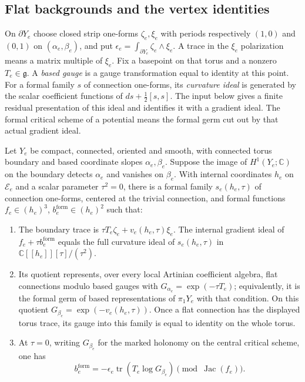 \subsection{Flat backgrounds and the vertex identities}

On $\partial Y_e$ choose closed strip one-forms $\zeta_e,\xi_e$ with
periods respectively $(1,0)$ and $(0,1)$ on
$(\alpha_e,\beta_e)$, and put
$\epsilon_e=\int_{\partial Y_e}\zeta_e\wedge\xi_e$.
A trace in the $\xi_e$ polarization means a matrix multiple of
$\xi_e$.  Fix a basepoint on that torus and a nonzero
$T_e\in\mathfrak g$.  A \emph{based gauge} is a gauge transformation
equal to identity at this point.  For a formal family $s$ of connection
one-forms, its \emph{curvature ideal} is generated by the scalar
coefficient functions of $ds+\tfrac12[s,s]$.  The input below gives a
finite residual presentation of this ideal and identifies it with a
gradient ideal.  The formal critical scheme of a potential means the
formal germ cut out by that actual gradient ideal.

\begin{lemma}
\label{for:edge-input}
Let $Y_e$ be compact, connected, oriented and smooth, with connected
torus boundary and based coordinate slopes $\alpha_e,\beta_e$.
Suppose the image of $H^1(Y_e;\mathbb C)$ on the boundary detects
$\alpha_e$ and vanishes on $\beta_e$.  With internal coordinates
$h_e$ on $\mathcal E_e$ and a scalar parameter $\tau^2=0$, there is
a formal family $s_e(h_e,\tau)$ of connection one-forms, centered at
the trivial connection, and formal functions
$f_e\in(h_e)^3$, $b_e^{\mathrm{form}}\in(h_e)^2$ such that:
\begin{enumerate}
\item The boundary trace is
$\tau T_e\zeta_e+v_e(h_e,\tau)\xi_e$.  The internal gradient ideal
of $f_e+\tau b_e^{\mathrm{form}}$ equals the full curvature ideal of
$s_e(h_e,\tau)$ in $\mathbb C[[h_e]][\tau]/(\tau^2)$.
\item Its quotient represents, over every local Artinian coefficient
algebra, flat connections modulo based gauges with
$G_{\alpha_e}=\exp(-\tau T_e)$; equivalently, it is the formal germ
of based representations of $\pi_1Y_e$ with that condition.
On this quotient $G_{\beta_e}=\exp(-v_e(h_e,\tau))$.
Once a flat connection has the displayed torus trace, its gauge into
this family is equal to identity on the whole torus.
\item At $\tau=0$, writing $G_{\beta_e}$ for the marked holonomy on
the central critical scheme, one has
\begin{equation}
\label{for:edge-log-coefficient}
 b_e^{\mathrm{form}}
 =-\epsilon_e\operatorname{tr}(T_e\log G_{\beta_e})
              \pmod{\operatorname{Jac}(f_e)}.
\end{equation}
\end{enumerate}
\end{lemma}

